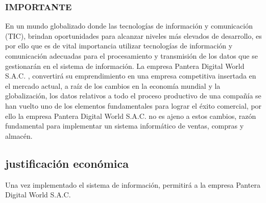 \documentclass[12pt,a4paper]{article}
\newcommand{\newsubsection}[1]{\subsection{\hspace{5mm} #1}}
\newcommand{\empresa}{Pantera Digital World S.A.C. }
\begin{document}
\subsubsection*{IMPORTANTE}
En un mundo globalizado donde las tecnologías de información y comunicación (TIC), brindan oportunidades para alcanzar niveles más elevados de desarrollo, es por ello que es de vital importancia utilizar tecnologías de información y comunicación adecuadas para el procesamiento y transmisión de los datos que se gestionarán en el sistema de información.
La empresa \empresa, convertirá su emprendimiento en una empresa competitiva insertada en el mercado actual, a raíz de los cambios en la economía mundial y la globalización, los datos relativos a todo el proceso productivo de una compañía se han vuelto uno de los elementos fundamentales para lograr el éxito comercial, por ello la empresa \empresa no es ajeno a estos cambios, razón fundamental para implementar un sistema informático de ventas, compras y almacén.


\newsubsection{justificación económica}
Una vez implementado el sistema de información, permitirá a la empresa \empresa %
\end{document}
